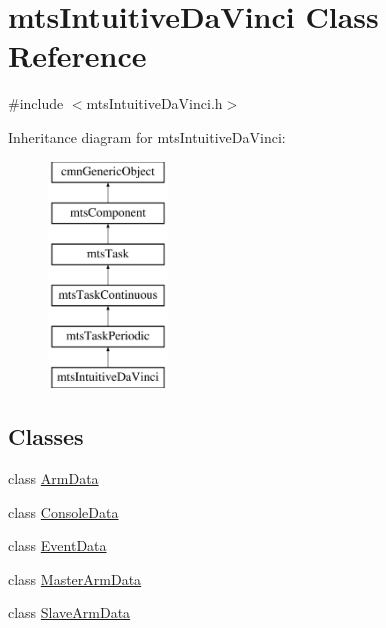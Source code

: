 \hypertarget{classmts_intuitive_da_vinci}{\section{mts\-Intuitive\-Da\-Vinci Class Reference}
\label{classmts_intuitive_da_vinci}
}


{\ttfamily \#include $<$mts\-Intuitive\-Da\-Vinci.\-h$>$}

Inheritance diagram for mts\-Intuitive\-Da\-Vinci\-:\begin{figure}[H]
\begin{center}
\leavevmode
\includegraphics[height=6.000000cm]{dd/db7/classmts_intuitive_da_vinci}
\end{center}
\end{figure}
\subsection*{Classes}
\begin{DoxyCompactItemize}
\item 
class \hyperlink{classmts_intuitive_da_vinci_1_1_arm_data}{Arm\-Data}
\item 
class \hyperlink{classmts_intuitive_da_vinci_1_1_console_data}{Console\-Data}
\item 
class \hyperlink{classmts_intuitive_da_vinci_1_1_event_data}{Event\-Data}
\item 
class \hyperlink{classmts_intuitive_da_vinci_1_1_master_arm_data}{Master\-Arm\-Data}
\item 
class \hyperlink{classmts_intuitive_da_vinci_1_1_slave_arm_data}{Slave\-Arm\-Data}
\end{DoxyCompactItemize}
